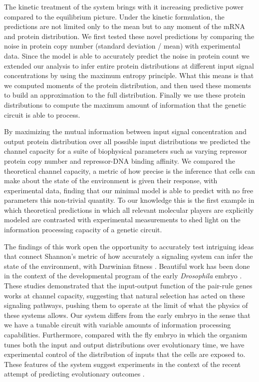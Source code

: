 The kinetic treatment of the system brings with it increasing predictive power
compared to the equilibrium picture. Under the kinetic formulation, the
predictions are not limited only to the mean but to any moment of the mRNA and
protein distribution. We first tested these novel predictions by comparing the
noise in protein copy number (standard deviation / mean) with experimental data.
Since the model is able to accurately predict the noise in protein count we
extended our analysis to infer entire protein distributions at different input
signal concentrations by using the maximum entropy principle. What this means is
that we computed moments of the protein distribution, and then used these
moments to build an approximation to the full distribution. Finally we use these
protein distributions to compute the maximum amount of information that the
genetic circuit is able to process.

By maximizing the mutual information between input signal concentration and
output protein distribution over all possible input distributions we predicted
the channel capacity for a suite of biophysical parameters such as varying
repressor protein copy number and repressor-DNA binding affinity. We compared
the theoretical channel capacity, a metric of how precise is the inference that
cells can make about the state of the environment is given their response, with
experimental data, finding that our minimal model is able to predict with no
free parameters this non-trivial quantity. To our knowledge this is the first
example in which theoretical predictions in which all relevant molecular players
are explicitly modeled are contrasted with experimental measurements to shed
light on the information processing capacity of a genetic circuit.

The findings of this work open the opportunity to accurately test intriguing
ideas that connect Shannon's metric of how accurately a signaling system can
infer the state of the environment, with Darwinian fitness \cite{Taylor2007a}.
Beautiful work has been done in the context of the developmental program of the
early {\it Drosophila} embryo \cite{Tkacik2008, Petkova2016}. These studies
demonstrated that the input-output function of the pair-rule genes works at
channel capacity, suggesting that natural selection has acted on these signaling
pathways, pushing them to operate at the limit of what the physics of these
systems allows. Our system differs from the early embryo in the sense that we
have a tunable circuit with variable amounts of information processing
capabilities. Furthermore, compared with the fly embryo in which the organism
tunes both the input and output distributions over evolutionary time, we have
experimental control of the distribution of inputs that the cells are exposed
to. These features of the system suggest experiments in the context of the
recent attempt of predicting evolutionary outcomes \cite{Lassig2017}.
